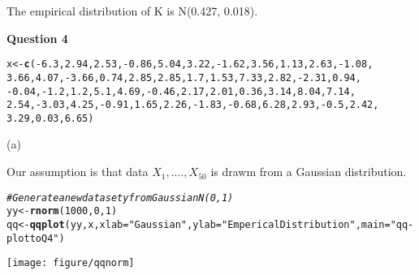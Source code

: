 \documentclass{article}\usepackage[]{graphicx}\usepackage[]{color}
\makeatletter
\newcommand{\hlnum}[1]{\textcolor[rgb]{0.686,0.059,0.569}{#1}}%
\newcommand{\hlstr}[1]{\textcolor[rgb]{0.192,0.494,0.8}{#1}}%
\newcommand{\hlcom}[1]{\textcolor[rgb]{0.678,0.584,0.686}{\textit{#1}}}%
\newcommand{\hlopt}[1]{\textcolor[rgb]{0,0,0}{#1}}%
\newcommand{\hlstd}[1]{\textcolor[rgb]{0.345,0.345,0.345}{#1}}%
\newcommand{\hlkwb}[1]{\textcolor[rgb]{0.69,0.353,0.396}{#1}}%
\newcommand{\hlkwc}[1]{\textcolor[rgb]{0.333,0.667,0.333}{#1}}%
\newcommand{\hlkwd}[1]{\textcolor[rgb]{0.737,0.353,0.396}{\textbf{#1}}}%
\newenvironment{kframe}{%
 \def\at@end@of@kframe{}%
 \ifinner\ifhmode%
  \def\at@end@of@kframe{\end{minipage}}%
  \begin{minipage}{\columnwidth}%
 \fi\fi%
 \def\FrameCommand##1{\hskip\@totalleftmargin \hskip-\fboxsep
 \colorbox{shadecolor}{##1}\hskip-\fboxsep
     \hskip-\linewidth \hskip-\@totalleftmargin \hskip\columnwidth}%
 \MakeFramed {\advance\hsize-\width
   \@totalleftmargin\z@ \linewidth\hsize
   \@setminipage}}%
 {\par\unskip\endMakeFramed%
 \at@end@of@kframe}
\newenvironment{knitrout}{}{} %
\makeatother
\begin{document}
The empirical distribution of K is N(0.427, 0.018). 


{\LARGE\bf{Question 4}}\\ %

\begin{knitrout}
\color{fgcolor}\begin{kframe}
\begin{alltt}
\hlstd{x} \hlkwb{<-} \hlkwd{c}\hlstd{(}\hlopt{-}\hlnum{6.3}\hlstd{,} \hlnum{2.94}\hlstd{,} \hlnum{2.53}\hlstd{,} \hlopt{-}\hlnum{0.86}\hlstd{,} \hlnum{5.04}\hlstd{,} \hlnum{3.22}\hlstd{,} \hlopt{-}\hlnum{1.62}\hlstd{,} \hlnum{3.56}\hlstd{,} \hlnum{1.13}\hlstd{,} \hlnum{2.63}\hlstd{,} \hlopt{-}\hlnum{1.08}\hlstd{,}
    \hlnum{3.66}\hlstd{,} \hlnum{4.07}\hlstd{,} \hlopt{-}\hlnum{3.66}\hlstd{,} \hlnum{0.74}\hlstd{,} \hlnum{2.85}\hlstd{,} \hlnum{2.85}\hlstd{,} \hlnum{1.7}\hlstd{,} \hlnum{1.53}\hlstd{,} \hlnum{7.33}\hlstd{,} \hlnum{2.82}\hlstd{,} \hlopt{-}\hlnum{2.31}\hlstd{,} \hlnum{0.94}\hlstd{,}
    \hlopt{-}\hlnum{0.04}\hlstd{,} \hlopt{-}\hlnum{1.2}\hlstd{,} \hlnum{1.2}\hlstd{,} \hlnum{5.1}\hlstd{,} \hlnum{4.69}\hlstd{,} \hlopt{-}\hlnum{0.46}\hlstd{,} \hlnum{2.17}\hlstd{,} \hlnum{2.01}\hlstd{,} \hlnum{0.36}\hlstd{,} \hlnum{3.14}\hlstd{,} \hlnum{8.04}\hlstd{,} \hlnum{7.14}\hlstd{,}
    \hlnum{2.54}\hlstd{,} \hlopt{-}\hlnum{3.03}\hlstd{,} \hlnum{4.25}\hlstd{,} \hlopt{-}\hlnum{0.91}\hlstd{,} \hlnum{1.65}\hlstd{,} \hlnum{2.26}\hlstd{,} \hlopt{-}\hlnum{1.83}\hlstd{,} \hlopt{-}\hlnum{0.68}\hlstd{,} \hlnum{6.28}\hlstd{,} \hlnum{2.93}\hlstd{,} \hlopt{-}\hlnum{0.5}\hlstd{,} \hlnum{2.42}\hlstd{,}
    \hlnum{3.29}\hlstd{,} \hlnum{0.03}\hlstd{,} \hlnum{6.65}\hlstd{)}
\end{alltt}
\end{kframe}
\end{knitrout}


{\Large{(a)}} 

Our assumption is that data $X_1,....,X_{50}$ is drawm from a Gaussian distribution.

\begin{knitrout}
\color{fgcolor}\begin{kframe}
\begin{alltt}
\hlcom{# Generate a new data set y from Gaussian N(0,1)}
\hlstd{yy} \hlkwb{<-} \hlkwd{rnorm}\hlstd{(}\hlnum{1000}\hlstd{,} \hlnum{0}\hlstd{,} \hlnum{1}\hlstd{)}
\hlstd{qq} \hlkwb{<-} \hlkwd{qqplot}\hlstd{(yy, x,} \hlkwc{xlab} \hlstd{=} \hlstr{"Gaussian"}\hlstd{,} \hlkwc{ylab} \hlstd{=} \hlstr{"Emperical Distribution"}\hlstd{,} \hlkwc{main} \hlstd{=} \hlstr{"qq-plot to Q4"}\hlstd{)}
\end{alltt}
\end{kframe}
\texttt{[image: figure/qqnorm]} 

\end{knitrout}
\end{document}
